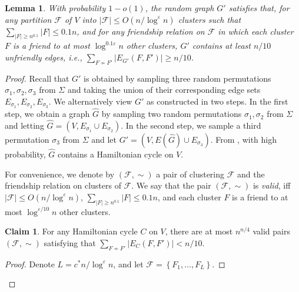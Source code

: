 \documentclass[11pt]{article}
\newtheorem{lemma}[theorem]{Lemma}
\theoremstyle{definition}
\newtheorem{claim}[theorem]{Claim}
\newcommand{\set}[1]{\left\{ #1 \right\}}
\newcommand{\fset}{{\mathcal{F}}}
\newcommand{\eps}{{\varepsilon}}
\newcounter{note}
\begin{document}
\begin{titlepage}

\begin{lemma} \label{lem:small}
With probability $1-o(1)$, the random graph $G'$ satisfies that, for any partition $\fset$ of $V$ into $|\fset|\le O(n/\log^{\eps} n)$ clusters such that $\sum_{|F|\ge n^{0.1}}|F|\le 0.1n$, and for any friendship relation on $\fset$ in which each cluster $F$ is a friend to at most $\log^{0.1 \eps} n$ other clusters, $G'$ contains at least $n/10$ unfriendly edges, i.e., $\sum_{F\not\sim F'}|E_{G'}(F,F')|\ge n/10$.
\end{lemma}

\begin{proof}
Recall that $G'$ is obtained by sampling three random permutations $\sigma_1,\sigma_2,\sigma_3$ from $\Sigma$ and taking the union of their corresponding edge sets $E_{\sigma_1}, E_{\sigma_2}, E_{\sigma_3}$. We alternatively view $G'$ as constructed in two steps. In the first step, we obtain a graph $\hat G$ by sampling two random permutations $\sigma_1,\sigma_2$ from $\Sigma$ and letting $\hat G=(V,E_{\sigma_1}\cup E_{\sigma_2})$. In the second step, we sample a third permutation $\sigma_3$ from $\Sigma$ and let $G'=(V, E(\hat G)\cup E_{\sigma_3})$.
From , with high probability, $\hat G$ contains a Hamiltonian cycle on $V$.

    For convenience, we denote by $(\fset,\sim)$ a pair of clustering $\fset$ and the friendship relation on clusters of $\fset$. We say that the pair $(\fset,\sim)$ is \emph{valid}, iff $|\fset|\le O(n/\log^{\eps} n)$, $\sum_{|F|\ge n^{0.1}}|F|\le 0.1n$, and each cluster $F$ is a friend to at most $\log^{\eps/10} n$ other clusters.

\begin{claim}
\label{clm: number of partition}
For any Hamiltonian cycle $C$ on $V$, there are at most $n^{n/4}$ valid pairs $(\fset,\sim)$ satisfying that $\sum_{F\not\sim F'}|E_{C}(F,F')| < n/10$.
\end{claim}
\begin{proof}
Denote $L=c^*n/\log^{\eps} n$,
and let $\fset=\set{F_1,\ldots,F_L}$.


\end{proof}
\end{proof}
\end{titlepage}
\end{document}
